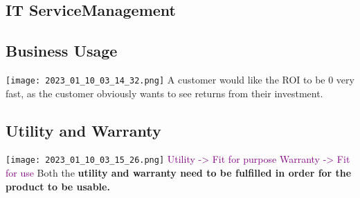 \documentclass[main.tex,fontsize=12pt,paper=a4,paper=landscape,DIV=calc,]{scrartcl}
\begin{document}
\begin{multicols*}{2}
\section{IT ServiceManagement}
\subsection{Business Usage}
\texttt{[image: 2023\_01\_10\_03\_14\_32.png]}\newline
A customer would like the ROI to be 0 very fast, as the customer obviously wants to see returns from their investment. 

\subsection{Utility and Warranty}
\texttt{[image: 2023\_01\_10\_03\_15\_26.png]}\newline
\textcolor{purple}{Utility -> Fit for purpose}\newline
\textcolor{purple}{Warranty -> Fit for use}\newline
Both the \textbf{utility and warranty need to be fulfilled in order for the product to be usable.} 


\end{multicols*}
\end{document}
